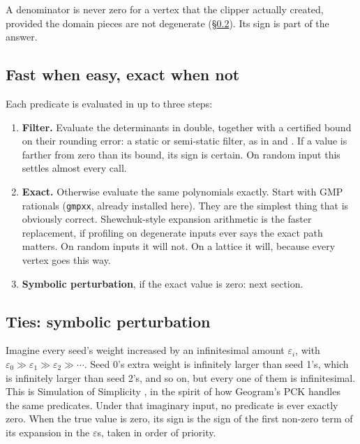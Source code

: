 \documentclass[11pt,a4paper]{article}
\newcommand{\code}[1]{\texttt{#1}}          %
\newcommand{\secref}[1]{\S\ref{#1}}
\begin{document}
A denominator is never zero for a vertex that the clipper actually created, provided the domain
pieces are not degenerate (\secref{ssec:sos}). Its sign is part of the answer.

\subsection{Fast when easy, exact when not}\label{ssec:filter}

Each predicate is evaluated in up to three steps:

\begin{enumerate}
\item \textbf{Filter.} Evaluate the determinants in double, together with a certified bound on
  their rounding error: a static or semi-static filter, as in \citet{shewchuk1997} and
  \citet{meyer2008}. If a value is farther from zero than its bound, its sign is certain. On
  random input this settles almost every call.
\item \textbf{Exact.} Otherwise evaluate the same polynomials exactly. Start with GMP rationals
  (\code{gmpxx}, already installed here). They are the simplest thing that is obviously
  correct. Shewchuk-style expansion arithmetic is the faster replacement, if profiling on
  degenerate inputs ever says the exact path matters. On random inputs it will not. On a lattice
  it will, because every vertex goes this way.
\item \textbf{Symbolic perturbation}, if the exact value is zero: next section.
\end{enumerate}

\subsection{Ties: symbolic perturbation}\label{ssec:sos}

Imagine every seed's weight increased by an infinitesimal amount $\varepsilon_i$, with
$\varepsilon_0 \gg \varepsilon_1 \gg \varepsilon_2 \gg \cdots$. Seed 0's extra weight is
infinitely larger than seed 1's, which is infinitely larger than seed 2's, and so on, but every
one of them is infinitesimal. This is Simulation of Simplicity \citep{edelsbrunner1990}, in the
spirit of how Geogram's PCK \citep{levy2016} handles the same predicates. Under that imaginary
input, no predicate is ever exactly zero. When the true value is zero, its sign is the sign of
the first non-zero term of its expansion in the $\varepsilon$s, taken in order of priority.
\end{document}
